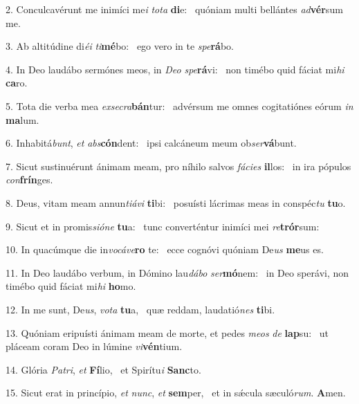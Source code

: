 2. Conculcavérunt me inimíci me\textit{i} \textit{to}\textit{ta} \textbf{di}e: \ast\  quóniam multi bellántes \textit{ad}\textbf{vér}sum me.\

3. Ab altitúdine di\textit{é}\textit{i} \textit{ti}\textbf{mé}bo: \ast\  ego vero in te \textit{spe}\textbf{rá}bo.\

4. In Deo laudábo sermónes meos, in \textit{De}\textit{o} \textit{spe}\textbf{rá}vi: \ast\  non timébo quid fáciat mi\textit{hi} \textbf{ca}ro.\

5. Tota die verba mea \textit{ex}\textit{se}\textit{cra}\textbf{bán}tur: \ast\  advérsum me omnes cogitatiónes eórum \textit{in} \textbf{ma}lum.\

6. Inhabitá\textit{bunt}, \textit{et} \textit{abs}\textbf{cón}dent: \ast\  ipsi calcáneum meum ob\textit{ser}\textbf{vá}bunt.\

7. Sicut sustinuérunt ánimam meam, pro níhilo salvos \textit{fá}\textit{ci}\textit{es} \textbf{il}los: \ast\  in ira pópulos \textit{con}\textbf{frín}ges.\

8. Deus, vitam meam annun\textit{ti}\textit{á}\textit{vi} \textbf{ti}bi: \ast\  posuísti lácrimas meas in conspéc\textit{tu} \textbf{tu}o.\

9. Sicut et in promis\textit{si}\textit{ó}\textit{ne} \textbf{tu}a: \ast\  tunc converténtur inimíci mei \textit{re}\textbf{trór}sum:\

10. In quacúmque die in\textit{vo}\textit{cá}\textit{ve}\textbf{ro} te: \ast\  ecce cognóvi quóniam De\textit{us} \textbf{me}us es.\

11. In Deo laudábo verbum, in Dómino lau\textit{dá}\textit{bo} \textit{ser}\textbf{mó}nem: \ast\  in Deo sperávi, non timébo quid fáciat mi\textit{hi} \textbf{ho}mo.\

12. In me sunt, De\textit{us}, \textit{vo}\textit{ta} \textbf{tu}a, \ast\  quæ reddam, laudatió\textit{nes} \textbf{ti}bi.\

13. Quóniam eripuísti ánimam meam de morte, et pedes \textit{me}\textit{os} \textit{de} \textbf{lap}su: \ast\  ut pláceam coram Deo in lúmine \textit{vi}\textbf{vén}tium.\

14. Glória \textit{Pa}\textit{tri}, \textit{et} \textbf{Fí}lio, \ast\  et Spirítu\textit{i} \textbf{Sanc}to.\

15. Sicut erat in princípio, \textit{et} \textit{nunc}, \textit{et} \textbf{sem}per, \ast\  et in sǽcula sæculó\textit{rum}. \textbf{A}men.\

